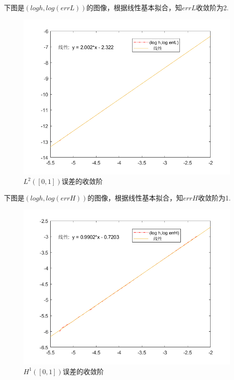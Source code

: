 \documentclass{article}
\begin{document}
下图是$(logh,log(errL))$的图像，根据线性基本拟合，知$errL$收敛阶为2.
\begin{figure}[H]
\centering
\includegraphics[scale=0.6]{errL_Convergence_Step.png}
\caption{\label{errL_Convergence_Step}$L^{2}([0,1])$误差的收敛阶}
\end{figure}

\newpage
下图是$(logh,log(errH))$的图像，根据线性基本拟合，知$errH$收敛阶为1.
\begin{figure}[H]
\centering
\includegraphics[scale=0.6]{errH_Convergence_Step.png}
\caption{\label{errH_Convergence_Step}$H^{1}([0,1])$误差的收敛阶}
\end{figure}
\end{document}
